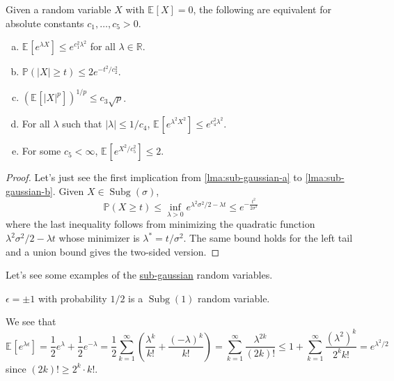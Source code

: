 \begin{lemma}\label{lma:sub-gaussian}
	Given a random variable \(X\) with \(\mathbb{E}_{}\left[X \right] =0\), the following are equivalent for absolute constants \(c_1, \dots , c_5 > 0\).
	\begin{enumerate}[(a)]
		\item\label{lma:sub-gaussian-a} \(\mathbb{E}_{}\left[e^{\lambda X} \right] \leq e^{c_1^2 \lambda ^2}\) for all \(\lambda \in \mathbb{R} \).
		\item\label{lma:sub-gaussian-b} \(\mathbb{P} (\vert X \vert \geq t) \leq 2 e^{- t^2 / c_2^2}\).
		\item\label{lma:sub-gaussian-c} \(\left( \mathbb{E}_{}\left[\vert X \vert ^p \right]  \right)^{1 / p} \leq c_3 \sqrt{p}  \).
		\item\label{lma:sub-gaussian-d} For all \(\lambda \) such that \(\vert \lambda  \vert \leq 1 / c_4 \), \(\mathbb{E}_{}\left[e^{\lambda ^2 X^2} \right] \leq e^{c_4^2 \lambda ^2} \).
		\item\label{lma:sub-gaussian-e} For some \(c_5 < \infty \), \(\mathbb{E}_{}\left[e^{X^2 / c_5^2}  \right] \leq 2\).
	\end{enumerate}
\end{lemma}
\begin{proof}
	Let's just see the first implication from \autoref{lma:sub-gaussian-a} to \autoref{lma:sub-gaussian-b}. Given \(X \in \mathop{\mathrm{Subg}}(\sigma ) \),
	\[
		\mathbb{P} (X\geq t) \leq \inf _{\lambda > 0} e^{\lambda ^2 \sigma ^2 / 2 - \lambda t} \leq e^{-\frac{t^2}{2\sigma ^2}}
	\]
	where the last inequality follows from minimizing the quadratic function \(\lambda ^{2} \sigma ^{2} / 2 - \lambda t\) whose minimizer is \(\lambda ^{\ast} = t / \sigma ^{2} \). The same bound holds for the left tail and a union bound gives the two-sided version.
\end{proof}

Let's see some examples of the \hyperref[def:sub-gaussian]{sub-gaussian} random variables.

\begin{eg}\label{eg:Rademacher-random-varaible}
	\(\epsilon = \pm 1\) with probability \(1 / 2\) is a \(\mathop{\mathrm{Subg}}(1) \) random variable.
\end{eg}
\begin{explanation}
	We see that
	\[
		\mathbb{E}_{}\left[e^{\lambda \epsilon } \right]
		= \frac{1}{2} e^\lambda + \frac{1}{2} e^{-\lambda }
		= \frac{1}{2} \sum_{k=1}^{\infty} \left( \frac{\lambda ^k}{k!} + \frac{(-\lambda )^k}{k!} \right)
		= \sum_{k=1}^{\infty} \frac{\lambda ^{2k}}{(2k)!}
		\leq 1 + \sum_{k=1}^{\infty} \frac{(\lambda ^2)^k}{2^k k!}
		= e^{\lambda ^2 / 2}
	\]
	since \((2k)! \geq 2^k \cdot k!\).
\end{explanation}

